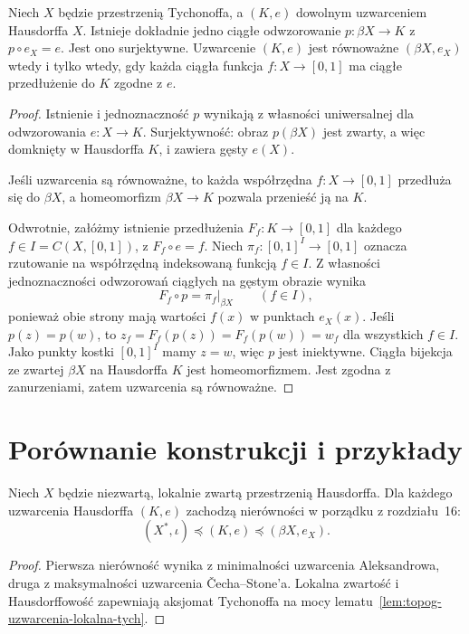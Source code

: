 \begin{twierdzenie}
\label{thm:topog-uzwarcenia-cech-stone-maksymalne}
Niech $X$ będzie przestrzenią Tychonoffa,
a $(K,e)$ dowolnym uzwarceniem
Hausdorffa $X$. Istnieje dokładnie jedno
ciągłe odwzorowanie
$p\colon\beta X\to K$
z $p\circ e_X=e$.
Jest ono surjektywne.
Uzwarcenie $(K,e)$ jest równoważne
$(\beta X,e_X)$ wtedy i tylko wtedy,
gdy każda ciągła funkcja
$f\colon X\to[0,1]$ ma ciągłe
przedłużenie do $K$ zgodne z $e$.
\end{twierdzenie}
\begin{proof}
Istnienie i jednoznaczność $p$
wynikają z własności uniwersalnej
dla odwzorowania $e\colon X\to K$.
Surjektywność: obraz $p(\beta X)$
jest zwarty, a więc domknięty
w Hausdorffa $K$, i zawiera
gęsty $e(X)$.

Jeśli uzwarcenia są równoważne,
to każda współrzędna
$f\colon X\to[0,1]$
przedłuża się do $\beta X$,
a homeomorfizm $\beta X\to K$
pozwala przenieść ją na $K$.

Odwrotnie, załóżmy istnienie
przedłużenia $F_f\colon K\to[0,1]$
dla każdego $f\in I=C(X,[0,1])$,
z $F_f\circ e=f$.
Niech $\pi_f\colon[0,1]^I\to[0,1]$
oznacza rzutowanie na współrzędną
indeksowaną funkcją $f\in I$.
Z własności jednoznaczności
odwzorowań ciągłych na gęstym obrazie
wynika
\[
F_f\circ p=\pi_f|_{\beta X}
\qquad(f\in I),
\]
ponieważ obie strony mają wartości
$f(x)$ w punktach $e_X(x)$.
Jeśli $p(z)=p(w)$, to
$z_f=F_f(p(z))=F_f(p(w))=w_f$
dla wszystkich $f\in I$.
Jako punkty kostki $[0,1]^I$
mamy $z=w$, więc $p$ jest iniektywne.
Ciągła bijekcja ze zwartej $\beta X$
na Hausdorffa $K$ jest homeomorfizmem.
Jest zgodna z zanurzeniami,
zatem uzwarcenia są równoważne.
\end{proof}

\section{Porównanie konstrukcji i przykłady}
\label{sec:topog-uzwarcenia-porownanie}

\begin{wniosek}
\label{cor:topog-uzwarcenia-krance}
Niech $X$ będzie niezwartą,
lokalnie zwartą przestrzenią Hausdorffa.
Dla każdego uzwarcenia Hausdorffa $(K,e)$
zachodzą nierówności w porządku
z rozdziału~16:
\[
(X^\ast,\iota)\preccurlyeq(K,e)
\preccurlyeq(\beta X,e_X).
\]
\end{wniosek}
\begin{proof}
Pierwsza nierówność wynika
z minimalności uzwarcenia Aleksandrowa,
druga z maksymalności uzwarcenia
Čecha--Stone'a. Lokalna zwartość i Hausdorffowość
zapewniają aksjomat Tychonoffa
na mocy
lematu~\ref{lem:topog-uzwarcenia-lokalna-tych}.
\end{proof}


